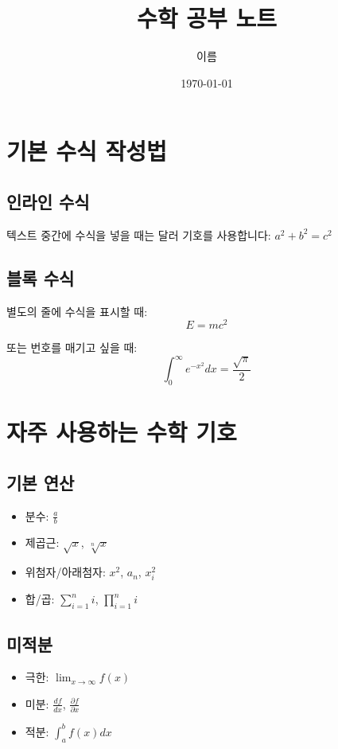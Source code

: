 \documentclass[12pt,a4paper]{article}
\title{수학 공부 노트}
\author{이름}
\date{\today}
\begin{document}
\maketitle
\tableofcontents  %
\newpage

\section{기본 수식 작성법}

\subsection{인라인 수식}
텍스트 중간에 수식을 넣을 때는 달러 기호를 사용합니다: $a^2 + b^2 = c^2$

\subsection{블록 수식}
별도의 줄에 수식을 표시할 때:
\[
    E = mc^2
\]

또는 번호를 매기고 싶을 때:
\begin{equation}
    \int_{0}^{\infty} e^{-x^2} dx = \frac{\sqrt{\pi}}{2}
\end{equation}

\section{자주 사용하는 수학 기호}

\subsection{기본 연산}
\begin{itemize}
    \item 분수: $\frac{a}{b}$
    \item 제곱근: $\sqrt{x}$, $\sqrt[n]{x}$
    \item 위첨자/아래첨자: $x^2$, $a_n$, $x_i^2$
    \item 합/곱: $\sum_{i=1}^{n} i$, $\prod_{i=1}^{n} i$
\end{itemize}

\subsection{미적분}
\begin{itemize}
    \item 극한: $\lim_{x \to \infty} f(x)$
    \item 미분: $\frac{df}{dx}$, $\frac{\partial f}{\partial x}$
    \item 적분: $\int_{a}^{b} f(x) dx$
\end{itemize}
\end{document}
